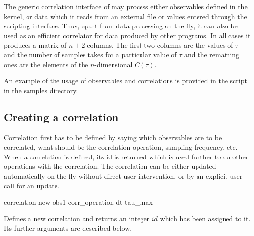The generic correlation interface of \es may process either observables
defined in the kernel, or data which it reads from an external file
or values entered through the scripting interface. 
Thus, apart from
data processing on the fly, it can also be used as an efficient correlator
for data produced by other programs. In all cases it produces a matrix of 
$n+2$ columns. The first two columns are the values of $\tau$ and 
the number of samples takes for a particular value of $\tau$ and the
remaining ones are the elements of the $n$-dimensional $C(\tau)$.


An example of the usage of observables and correlations is provided 
in the script  in the samples directory.


\subsection{Creating a correlation}

Correlation first has to be defined by saying which observables 
are to be correlated, what should be the correlation operation, sampling
frequency, etc. When a correlation is defined, its id is returned which is
used further to do other operations with the correlation.
The correlation can be either updated automatically on the fly without
direct user intervention, or by an explicit user call for an update.

\begin{essyntax}
correlation new obs1   corr_operation  dt  tau_max   
\end{essyntax}

Defines a new correlation and returns an integer
$id$ which has been assigned to it. Its further arguments are
described below.


